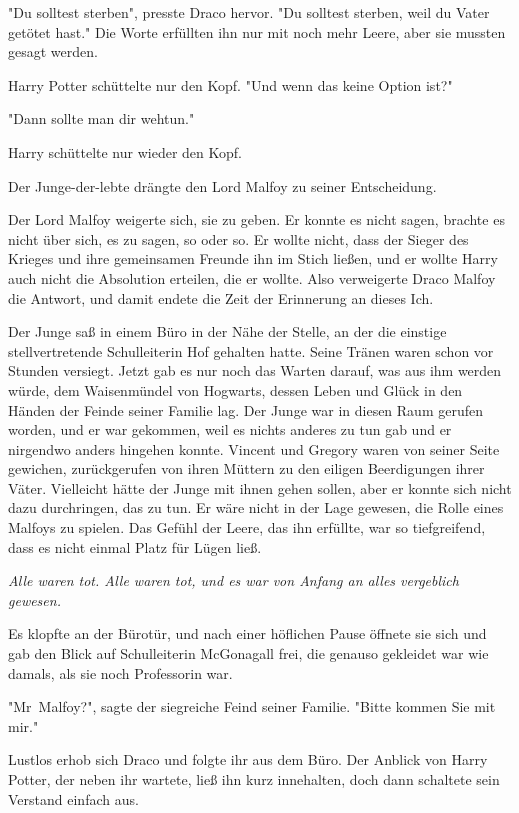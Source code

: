 {"Du solltest sterben", presste Draco hervor. "Du solltest sterben, weil du Vater getötet hast." Die Worte erfüllten ihn nur mit noch mehr Leere, aber sie mussten gesagt werden.

Harry Potter schüttelte nur den Kopf. "Und wenn das keine Option ist?"

"Dann sollte man dir wehtun."

Harry schüttelte nur wieder den Kopf.

Der Junge-der-lebte drängte den Lord Malfoy zu seiner Entscheidung.

Der Lord Malfoy weigerte sich, sie zu geben. Er konnte es nicht sagen, brachte es nicht über sich, es zu sagen, so oder so. Er wollte nicht, dass der Sieger des Krieges und ihre gemeinsamen Freunde ihn im Stich ließen, und er wollte Harry auch nicht die Absolution erteilen, die er wollte. Also verweigerte Draco Malfoy die Antwort, und damit endete die Zeit der Erinnerung an dieses Ich.

Der Junge saß in einem Büro in der Nähe der Stelle, an der die einstige stellvertretende Schulleiterin Hof gehalten hatte. Seine Tränen waren schon vor Stunden versiegt. Jetzt gab es nur noch das Warten darauf, was aus ihm werden würde, dem Waisenmündel von Hogwarts, dessen Leben und Glück in den Händen der Feinde seiner Familie lag. Der Junge war in diesen Raum gerufen worden, und er war gekommen, weil es nichts anderes zu tun gab und er nirgendwo anders hingehen konnte. Vincent und Gregory waren von seiner Seite gewichen, zurückgerufen von ihren Müttern zu den eiligen Beerdigungen ihrer Väter. Vielleicht hätte der Junge mit ihnen gehen sollen, aber er konnte sich nicht dazu durchringen, das zu tun. Er wäre nicht in der Lage gewesen, die Rolle eines Malfoys zu spielen. Das Gefühl der Leere, das ihn erfüllte, war so tiefgreifend, dass es nicht einmal Platz für Lügen ließ.

\emph{Alle waren tot. Alle waren tot, und es war von Anfang an alles vergeblich gewesen.}

Es klopfte an der Bürotür, und nach einer höflichen Pause öffnete sie sich und gab den Blick auf Schulleiterin McGonagall frei, die genauso gekleidet war wie damals, als sie noch Professorin war.

"Mr~Malfoy?", sagte der siegreiche Feind seiner Familie. "Bitte kommen Sie mit mir."

Lustlos erhob sich Draco und folgte ihr aus dem Büro. Der Anblick von Harry Potter, der neben ihr wartete, ließ ihn kurz innehalten, doch dann schaltete sein Verstand einfach aus.

}
